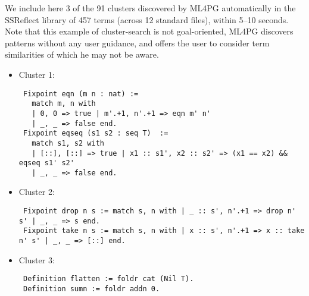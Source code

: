 \begin{example}
We include here 3 of the 91 clusters discovered by ML4PG automatically in the SSReflect library of 457 terms (across 12 standard files), within 5--10 seconds.
Note that this example of cluster-search is not goal-oriented, ML4PG discovers patterns without any user guidance, and offers the user to consider term similarities of which he may 
not be aware. 

\begin{itemize}
 \item Cluster 1:
{\scriptsize \begin{lstlisting}
 Fixpoint eqn (m n : nat) :=
   match m, n with 
   | 0, 0 => true | m'.+1, n'.+1 => eqn m' n' 
   | _, _ => false end.
 Fixpoint eqseq (s1 s2 : seq T)  :=
   match s1, s2 with 
   | [::], [::] => true | x1 :: s1', x2 :: s2' => (x1 == x2) && eqseq s1' s2' 
   | _, _ => false end.         
\end{lstlisting}}
    
\item  Cluster 2:
{\scriptsize 
\begin{lstlisting}
 Fixpoint drop n s := match s, n with | _ :: s', n'.+1 => drop n' s' | _, _ => s end.
 Fixpoint take n s := match s, n with | x :: s', n'.+1 => x :: take n' s' | _, _ => [::] end.
\end{lstlisting}}

\item Cluster 3:
{\scriptsize 
\begin{lstlisting}
 Definition flatten := foldr cat (Nil T).
 Definition sumn := foldr addn 0.
\end{lstlisting}} 
\end{itemize}



\end{example}

